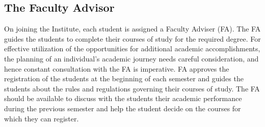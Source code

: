 \subsection{The Faculty Advisor}

On joining the Institute, each student is assigned a Faculty Adviser (FA). The FA guides the students to complete their courses of study for the required degree. For effective utilization of the opportunities for additional academic accomplishments, the planning of an individual’s academic journey needs careful consideration, and hence constant consultation with the FA is imperative. FA approves the registration of the students at the beginning of each semester and guides the students about the rules and regulations governing their courses of study. The FA should be available to discuss with the students their academic performance during the previous semester and help the student decide on the courses for which they can register.